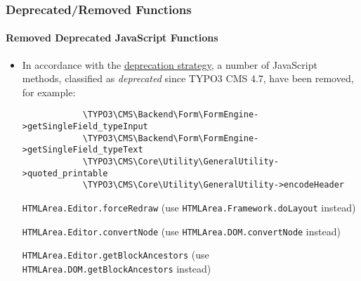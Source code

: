\begin{frame}[fragile]
	\frametitle{Deprecated/Removed Functions}
	\framesubtitle{Removed Deprecated JavaScript Functions}

	\begin{itemize}
		\item In accordance with the \href{http://forge.typo3.org/projects/typo3v4-core/wiki/CoreDevPolicy}{deprecation strategy},
			a number of JavaScript methods, classified as \textit{deprecated} since TYPO3 CMS 4.7, have been removed, for example:

		\begin{lstlisting}
			\TYPO3\CMS\Backend\Form\FormEngine->getSingleField_typeInput
			\TYPO3\CMS\Backend\Form\FormEngine->getSingleField_typeText
			\TYPO3\CMS\Core\Utility\GeneralUtility->quoted_printable
			\TYPO3\CMS\Core\Utility\GeneralUtility->encodeHeader
		\end{lstlisting}

		\smaller
			\texttt{HTMLArea.Editor.forceRedraw}\newline
				(use \texttt{HTMLArea.Framework.doLayout} instead)
				\vspace{0.2cm}

			\texttt{HTMLArea.Editor.convertNode}\newline
				(use \texttt{HTMLArea.DOM.convertNode} instead)
				\vspace{0.2cm}

			\texttt{HTMLArea.Editor.getBlockAncestors}\newline
				(use \texttt{HTMLArea.DOM.getBlockAncestors} instead)
		\normalsize

	\end{itemize}

\end{frame}


